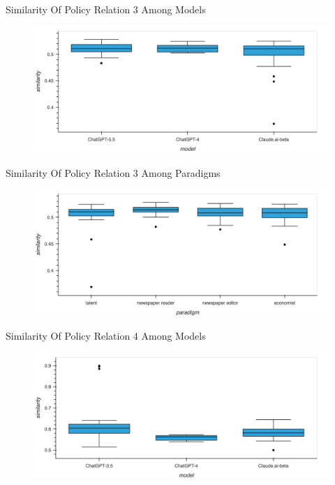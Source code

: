 \documentclass[12pt]{beamer}
\begin{document}
\begin{frame}{Similarity Of Policy Relation 3 Among Models}
\begin{figure}[H]
\centering
\includegraphics[width=11.5cm]{Figures/fig31.png}
\end{figure}
\end{frame}


\begin{frame}{Similarity Of Policy Relation 3 Among Paradigms}
\begin{figure}[H]
\centering
\includegraphics[width=11.5cm]{Figures/fig32.png}
\end{figure}
\end{frame}


\begin{frame}{Similarity Of Policy Relation 4 Among Models}
\begin{figure}[H]
\centering
\includegraphics[width=11.5cm]{Figures/fig33.png}
\end{figure}
\end{frame}
\end{document}
